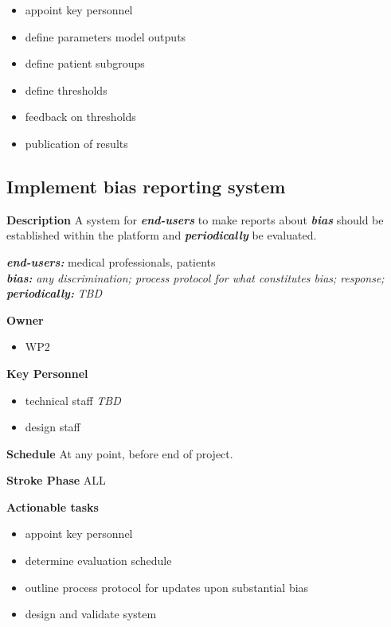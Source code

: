 \documentclass[
  letterpaper,
  DIV=11,
  numbers=noendperiod]{scrreport}
\providecommand{\tightlist}{%
  \setlength{\itemsep}{0pt}\setlength{\parskip}{0pt}}\usepackage{longtable,booktabs,array}
\begin{document}
\begin{itemize}
\tightlist
\item
  appoint key personnel
\item
  define parameters model outputs
\item
  define patient subgroups
\item
  define thresholds
\item
  feedback on thresholds
\item
  publication of results
\end{itemize}

\hypertarget{implement-bias-reporting-system}{%
\subsection{Implement bias reporting
system}\label{implement-bias-reporting-system}}

\textbf{Description} A system for \textbf{\emph{end-users}} to make
reports about \textbf{\emph{bias}} should be established within the
platform and \textbf{\emph{periodically}} be evaluated.

\textbf{\emph{end-users:}} medical professionals, patients\\
\textbf{\emph{bias:}} \emph{any discrimination; process protocol for
what constitutes bias; response;}\\
\textbf{\emph{periodically:}} \emph{TBD}

\textbf{Owner}

\begin{itemize}
\tightlist
\item
  WP2
\end{itemize}

\textbf{Key Personnel}

\begin{itemize}
\tightlist
\item
  technical staff \emph{TBD}
\item
  design staff
\end{itemize}

\textbf{Schedule} At any point, before end of project.

\textbf{Stroke Phase} ALL

\textbf{Actionable tasks}

\begin{itemize}
\tightlist
\item
  appoint key personnel
\item
  determine evaluation schedule
\item
  outline process protocol for updates upon substantial bias
\item
  design and validate system
\end{itemize}
\end{document}
